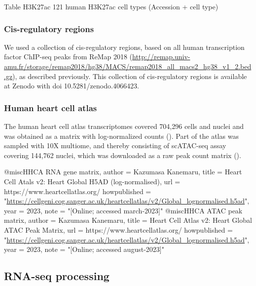 Table H3K27ac
121 human H3K27ac cell types (Accession + cell type)

\subsubsection{Cis-regulatory regions}

We used a collection of cis-regulatory regions, based on all human transcription factor ChIP-seq peaks from ReMap 2018\cite{Chneby2017} (\url{http://remap.univ-amu.fr/storage/remap2018/hg38/MACS/remap2018_all_macs2_hg38_v1_2.bed.gz}), as described previously\cite{Xu_2020}. This collection of cis-regulatory regions is available at Zenodo with doi 10.5281/zenodo.4066423.

\subsubsection{Human heart cell atlas}

The human heart cell atlas transcriptomes covered 704,296 cells and nuclei and was obtained as a matrix with log-normalized counts (\cite{HHCA RNA gene matrix}). Part of the atlas was sampled with 10X multiome, and thereby consisting of scATAC-seq assay covering 144,762 nuclei, which was downloaded as a raw peak count matrix (\cite{HHCA ATAC peak matrix}).

@misc{HHCA RNA gene matrix,
  author = {Kazumasa Kanemaru},
  title = {{Heart Cell Atals v2: Heart Global H5AD (log-normalised)}},
  url = {https://www.heartcellatlas.org/}
  howpublished = "\url{https://cellgeni.cog.sanger.ac.uk/heartcellatlas/v2/Global_lognormalised.h5ad}",
  year = {2023}, 
  note = "[Online; accessed march-2023]"
}
@misc{HHCA ATAC peak matrix,
  author = {Kazumasa Kanemaru},
  title = {{Heart Cell Atlas v2: Heart Global ATAC Peak Matrix}},
  url = {https://www.heartcellatlas.org/}
  howpublished = "\url{https://cellgeni.cog.sanger.ac.uk/heartcellatlas/v2/Global_lognormalised.h5ad}",
  year = {2023}, 
  note = "[Online; accessed august-2023]"
}


\subsection{RNA-seq processing}

